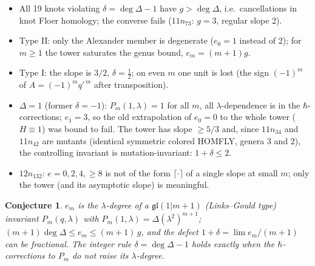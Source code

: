 \documentclass[11pt]{article}
\newtheorem{conjecture}{Conjecture}
\theoremstyle{definition}
\theoremstyle{remark}
\begin{document}
\begin{itemize}
\item All 19 knots violating $\delta=\deg\Delta-1$ have $g>\deg\Delta$, i.e.\ cancellations in knot
Floer homology; the converse fails ($11n_{73}$: $g=3$, regular slope 2).
\item Type II: only the Alexander member is degenerate ($e_0=1$ instead of 2); for $m\ge1$ the tower
saturates the genus bound, $e_m=(m+1)g$.
\item Type I: the slope is $3/2$, $\delta=\tfrac12$; on even $m$ one unit is lost (the sign
$(-1)^m$ of $A=(-1)^m q'^{\,m}$ after transposition).
\item $\Delta=1$ (former $\delta=-1$): $P_m(1,\lambda)=1$ for all $m$, all $\lambda$-dependence is in the
$\hbar$-corrections; $e_1=3$, so the old extrapolation of $e_0=0$ to the whole tower ($H\equiv1$) was
bound to fail.  The tower has slope $\ge 5/3$ and, since $11n_{34}$ and $11n_{42}$ are mutants
(identical symmetric colored HOMFLY, genera 3 and 2), the controlling invariant is
mutation-invariant: $1+\delta\le 2$.
\item $12n_{132}$: $e=0,2,4,\ge 8$ is not of the form $\lceil\cdot\rceil$ of a single slope at small
$m$; only the tower (and its asymptotic slope) is meaningful.
\end{itemize}

\begin{conjecture}
$e_m$ is the $\lambda$-degree of a $\mathfrak{gl}(1|m+1)$ (Links--Gould type) invariant $P_m(q,\lambda)$
with $P_m(1,\lambda)=\Delta(\lambda^2)^{m+1}$; $(m+1)\deg\Delta\le e_m\le (m+1)\,g$, and the defect
$1+\delta=\lim e_m/(m+1)$ can be fractional.  The integer rule $\delta=\deg\Delta-1$ holds exactly when the
$\hbar$-corrections to $P_m$ do not raise its $\lambda$-degree.
\end{conjecture}
\end{document}
